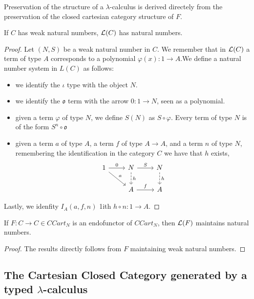 \begin{remark}
  Preservation of the structure of a $\lambda$-calculus is derived directely from the preservation of the closed cartesian category structure of $F$.
\end{remark}

\begin{proposition}\label{natural-numbers}
  If $C$ has weak natural numbers, $\mathcal{L} (C)$ has natural numbers. 
\end{proposition}
\begin{proof}
  Let $(N,S)$ be a weak natural number in $C$. We remember that in $\mathcal{L}(C)$ a term of type $A$ corresponds to a polynomial $\varphi(x): 1 \to A$.We define a natural number system in $L(C)$ as follows:
  \begin{itemize}
  \item we identify the $\iota$ type with the object $N$.
  \item we identify the $\mathfrak{o}$ term with the arrow $0: 1 \to N$, seen as a polynomial.
  \item given a term $\varphi$ of type $N$, we define $S(N)$ as $S\circ\varphi$. Every term of type $N$ is of the form $S^n\circ \mathfrak o$
  \item given a term $a$ of type $A$, a term $f$ of type $A\to A$, and a term $n$  of type $N$, remembering the identification in the category $C$ we have that $h$ exists,
    \[
      \begin{tikzcd}
        1\arrow{dr}{a}\arrow{r}{0} & N\arrow{r}{S}\arrow[dashed]{d}{h} & N\arrow[dashed]{d}{h}\\
        & A\arrow{r}{f} & A
      \end{tikzcd}
    \]
  \end{itemize}

  Lastly, we idenfity $I_A(a,f,n)$ 1ith $h\circ n: 1 \to A$.
  
\end{proof}

\begin{proposition}
  If $F: C\to C \in CCart_N$ is an endofunctor of $CCart_N$, then $\mathcal{L} (F)$ maintains natural numbers.
\end{proposition}

\begin{proof}

  The results directly follows from $F$ maintaining weak natural numbers. 
\end{proof}

\subsection{The Cartesian Closed Category generated by a typed $\lambda$-calculus}


